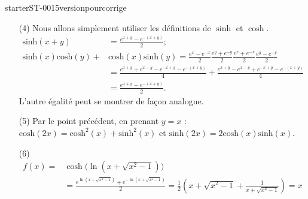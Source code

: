 
\begin{corrige}{starterST-0015versionpourcorrige}
\begin{enumerate}
\item[(4)] Nous allons simplement utiliser les définitions de $\sinh$ et  $\cosh$. 
  \begin{equation*}
    \begin{aligned}
      \text{sinh} (x+y)& = \frac{e^{x+y}-e^{-(x+y)}}{2} ; \\
      \text{sinh}(x) \text{cosh}(y)+&\text{cosh}(x)\text{sinh}(y) =\frac{e^{x}-e^{-x}}{2}\frac{e^{y}+e^{-y}}{2}\frac{e^{x}+e^{-x}}{2}\frac{e^{y}-e^{-y}}{2}\\
      &=\frac{e^{x+y}+e^{x-y}-e^{-x+y}-e^{-(x+y)}}{4} +\frac{e^{x+y}-e^{x-y}+e^{-x+y}-e^{-(x+y)}}{4} \\
      &=\frac{e^{x+y}-e^{-(x+y)}}{2}. 
    \end{aligned}
  \end{equation*}
  L'autre égalité peut se montrer de façon analogue.
\item[(5)] Par le point précédent, en prenant $y=x$ : $\text{cosh}(2x)=\text{cosh}^2(x)+\text{sinh}^2(x) $ et $\text{sinh}(2x)= 2\text{cosh}(x)\text{sinh}(x) $.
 \item[(6)] 
   \begin{equation*}
     \begin{aligned}
       f(x)=&\cosh\Big(\ln(x+\sqrt{x^2-1})\Big)\\
       &=\frac{e^{\ln(x+\sqrt{x^2-1})}+e^{-\ln(x+\sqrt{x^2-1})}}{2} = \frac{1}{2}\left(x+\sqrt{x^2-1} + \frac{1}{x+\sqrt{x^2-1}}\right) =x
     \end{aligned}
   \end{equation*}
\end{enumerate}

\end{corrige}
